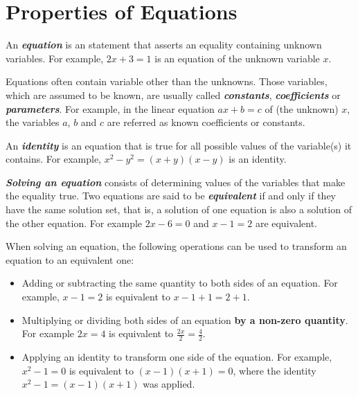 \documentclass[en,12pt]{elegantbook}
\newenvironment{rmdnote}{
    \par\noindent
    \makebox[-\width][r]{
    \tiny\color{red!90}
    \textdbend
    \hspace*{2pt}
    }
    \makebox[\width][l]{
        \hspace*{3pt}
        \textbf{
            \color{second}
            Note 
        }
    }
    \begin{shaded}
    \itshape
}{
    \par
    \end{shaded}
}
\begin{document}
\hypertarget{properties-of-equations}{%
\section{Properties of Equations}\label{properties-of-equations}}

An \textbf{\emph{equation}} is an statement that asserts an equality containing unknown variables. For example, \(2x+3=1\) is an equation of the unknown variable \(x\).

Equations often contain variable other than the unknowns. Those variables, which are assumed to be known, are usually called \textbf{\emph{constants}}, \textbf{\emph{coefficients}} or \textbf{\emph{parameters}}. For example, in the linear equation \(ax+b=c\) of (the unknown) \(x\), the variables \(a\), \(b\) and \(c\) are referred as known coefficients or constants.

An \textbf{\emph{identity}} is an equation that is true for all possible values of the variable(s) it contains. For example, \(x^2-y^2=(x+y)(x-y)\) is an identity.

\textbf{\emph{Solving an equation}} consists of determining values of the variables that make the equality true. Two equations are said to be \textbf{\emph{equivalent}} if and only if they have the same solution set, that is, a solution of one equation is also a solution of the other equation. For example \(2x-6=0\) and \(x-1=2\) are equivalent.

\begin{rmdnote}

When solving an equation, the following operations can be used to transform an equation to an equivalent one:

\begin{itemize}
\item
  Adding or subtracting the same quantity to both sides of an equation. For example, \(x-1=2\) is equivalent to \(x-1+1=2+1\).
\item
  Multiplying or dividing both sides of an equation \textbf{by a non-zero quantity}. For example \(2x=4\) is equivalent to \(\frac{2x}{2}=\frac{4}{2}\).
\item
  Applying an identity to transform one side of the equation. For example, \(x^2-1=0\) is equivalent to \((x-1)(x+1)=0\), where the identity \(x^2-1=(x-1)(x+1)\) was applied.
\end{itemize}

\end{rmdnote}
\end{document}
